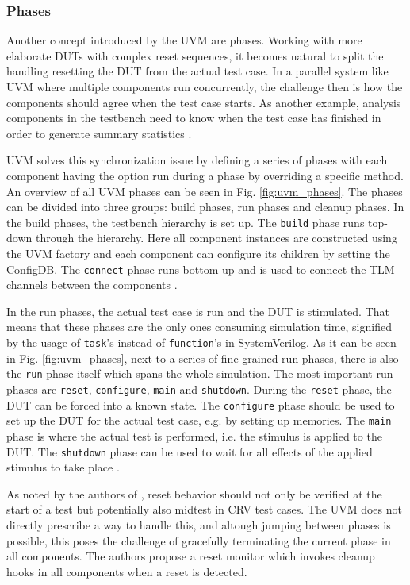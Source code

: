 \documentclass[12pt]{report}
\newcommand{\ttt}{\texttt}
\begin{document}
\subsubsection{Phases}
Another concept introduced by the UVM are phases. Working with more elaborate DUTs with complex reset sequences, it
becomes natural to split the handling resetting the DUT from the actual test case. In a parallel system like UVM
where multiple components run concurrently, the challenge then is how the components should agree when the test case
starts. As another example, analysis components in the testbench need to know when the test case has finished in
order to generate summary statistics \cite[ch. 4.6]{mehta2018asic}.

UVM solves this synchronization issue by defining a series of phases with each component having the option run during
a phase by overriding a specific method. An overview of all UVM phases can be seen in Fig. \ref{fig:uvm_phases}. The
phases can be divided into three groups: build phases, run phases and cleanup phases. In the build phases, the
testbench hierarchy is set up. The \ttt{build} phase runs top-down through the hierarchy. Here all component
instances are constructed using the UVM factory and each component can configure its children by setting the
ConfigDB. The \ttt{connect} phase runs bottom-up and is used to connect the TLM channels between the components
\cite[ch. 4.6]{mehta2018asic}.

In the run phases, the actual test case is run and the DUT is stimulated. That means that these phases are the only
ones consuming simulation time, signified by the usage of \ttt{task}'s instead of \ttt{function}'s in SystemVerilog.
As it can be seen in Fig. \ref{fig:uvm_phases}, next to a series of fine-grained run phases, there is also the
\ttt{run} phase itself which spans the whole simulation. The most important run phases are \ttt{reset},
\ttt{configure}, \ttt{main} and \ttt{shutdown}. During the \ttt{reset} phase, the DUT can be forced into a known
state. The \ttt{configure} phase should be used to set up the DUT for the actual test case, e.g. by setting up
memories. The \ttt{main} phase is where the actual test is performed, i.e. the stimulus is applied to the DUT. The
\ttt{shutdown} phase can be used to wait for all effects of the applied stimulus to take place \cite[ch. 4.6]{mehta2018asic}.

As noted by the authors of \cite{dvcon2014reset}, reset behavior should not only be verified at the start of a test
but potentially also midtest in CRV test cases. The UVM does not directly prescribe a way to handle this, and altough
jumping between phases is possible, this poses the challenge of gracefully terminating the current phase in all
components. The authors propose a reset monitor which invokes cleanup hooks in all components when a reset is detected.
\end{document}

